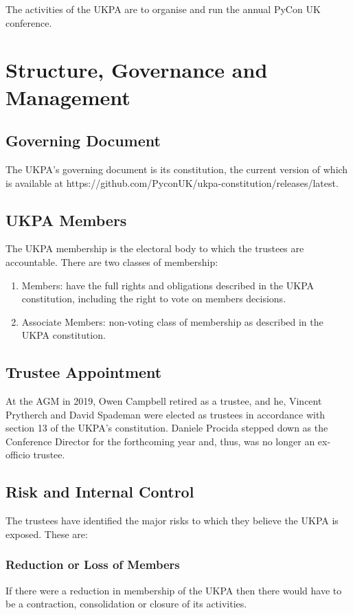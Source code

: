 \documentclass[11pt, final]{article}
\begin{document}
    The activities of the UKPA are to organise and run the annual PyCon UK conference.

    \section{Structure, Governance and Management}

        \subsection{Governing Document}
        The UKPA's governing document is its constitution, the current version of which is available at https://github.com/PyconUK/ukpa-constitution/releases/latest.

        \subsection{UKPA Members}
        The UKPA membership is the electoral body to which the trustees are accountable.
		There are two classes of membership:

		\begin{enumerate}
			\item Members: have the full rights and obligations described in the UKPA constitution, including the right to vote on members decisions.
			\item Associate Members: non-voting class of membership as described in the UKPA constitution.
		\end{enumerate}

        \subsection{Trustee Appointment}
		At the AGM in 2019, Owen Campbell retired as a trustee, and he, Vincent Prytherch and David Spademan were elected as trustees in accordance with section 13 of the UKPA's constitution.
Daniele Procida stepped down as the Conference Director for the forthcoming year and, thus, was no longer an ex-officio trustee.

	    \subsection{Risk and Internal Control}
        The trustees have identified the major risks to which they believe the UKPA is exposed. These are:

          \subsubsection{Reduction or Loss of Members}
            If there were a reduction in membership of the UKPA then there would have to be a contraction, consolidation or closure of its activities.
\end{document}
